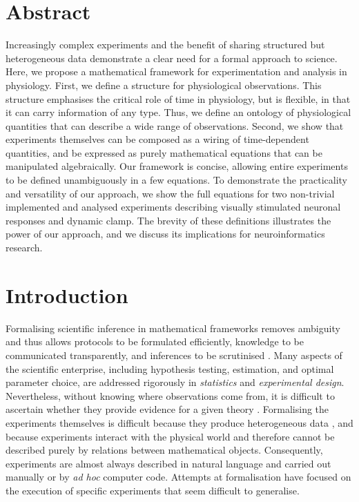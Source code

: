 
\section*{Abstract}

Increasingly complex experiments and the benefit of sharing structured
but heterogeneous data demonstrate a clear need for a formal approach
to science.  Here, we propose a mathematical framework for
experimentation and analysis in physiology. First, we define a
structure for physiological observations. This structure emphasises
the critical role of time in physiology, but is flexible, in that it
can carry information of any type. Thus, we define an ontology of
physiological quantities that can describe a wide range of
observations. Second, we show that experiments themselves can be
composed as a wiring of time-dependent quantities, and be expressed as
purely mathematical equations that can be manipulated
algebraically. Our framework is concise, allowing entire experiments
to be defined unambiguously in a few equations. To demonstrate the
practicality and versatility of our approach, we show the full
equations for two non-trivial implemented and analysed experiments
describing visually stimulated neuronal responses and dynamic
clamp. The brevity of these definitions illustrates the power of our
approach, and we discuss its implications for neuroinformatics
research.

\section*{Introduction}

Formalising scientific inference in mathematical frameworks removes
ambiguity and thus allows protocols to be formulated efficiently,
knowledge to be communicated transparently, and inferences to be
scrutinised \citep{Soldatova2006, Jaynes2003, Krantz1971}. Many
aspects of the scientific enterprise, including hypothesis testing,
estimation, and optimal parameter choice, are addressed rigorously in
\emph{statistics} and \emph{experimental design}. Nevertheless,
without knowing where observations come from, it is difficult to
ascertain whether they provide evidence for a given theory
\citep{Pool2002,MacKenzie-Graham2008,VanHorn2009}. Formalising the
experiments themselves is difficult because they produce heterogeneous
data \citep{Tukey1962}, and because experiments interact with the
physical world and therefore cannot be described purely by relations
between mathematical objects. Consequently, experiments are 
almost always described in natural language and carried out manually or by
\emph{ad hoc} computer code. Attempts at formalisation have focused on the
execution of specific experiments \citep{Jenkins1989, Manduchi1990, King2004}
that seem difficult to generalise.

